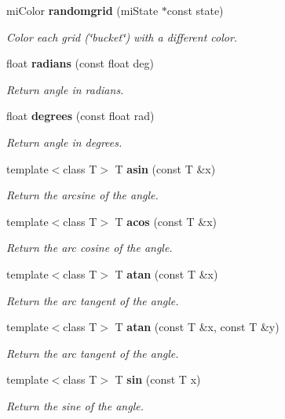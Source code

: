 \begin{CompactItemize}
mi\-Color {\bf randomgrid} (mi\-State $\ast$const state)
\begin{CompactList}\small\item\em Color each grid (\char`\"{}bucket\char`\"{}) with a different color. \item\end{CompactList}\item 
float {\bf radians} (const float deg)
\begin{CompactList}\small\item\em Return angle in radians. \item\end{CompactList}\item 
float {\bf degrees} (const float rad)
\begin{CompactList}\small\item\em Return angle in degrees. \item\end{CompactList}\item 
template$<$class T$>$ T {\bf asin} (const T \&x)
\begin{CompactList}\small\item\em Return the arcsine of the angle. \item\end{CompactList}\item 
template$<$class T$>$ T {\bf acos} (const T \&x)
\begin{CompactList}\small\item\em Return the arc cosine of the angle. \item\end{CompactList}\item 
template$<$class T$>$ T {\bf atan} (const T \&x)
\begin{CompactList}\small\item\em Return the arc tangent of the angle. \item\end{CompactList}\item 
template$<$class T$>$ T {\bf atan} (const T \&x, const T \&y)
\begin{CompactList}\small\item\em Return the arc tangent of the angle. \item\end{CompactList}\item 
template$<$class T$>$ T {\bf sin} (const T x)
\begin{CompactList}\small\item\em Return the sine of the angle. \item\end{CompactList}\item 

\end{CompactItemize}
